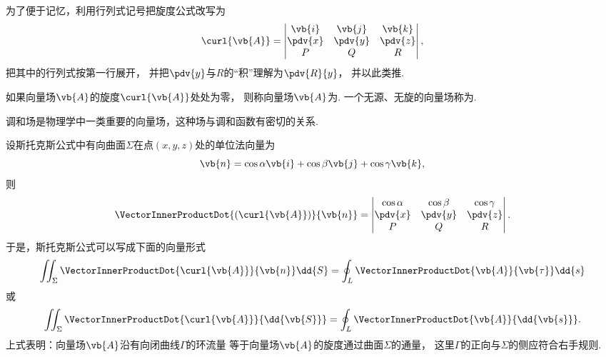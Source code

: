 为了便于记忆，利用行列式记号把旋度公式改写为\begin{equation*}
	\curl{\vb{A}}
	= \begin{vmatrix}
		\vb{i} & \vb{j} & \vb{k} \\
		\pdv{x} & \pdv{y} & \pdv{z} \\
		P & Q & R
	\end{vmatrix},
\end{equation*}
把其中的行列式按第一行展开，
并把\(\pdv{y}\)与\(R\)的“积”理解为\(\pdv{R}{y}\)，
并以此类推.

\begin{definition}
如果向量场\(\vb{A}\)的旋度\(\curl{\vb{A}}\)处处为零，
则称向量场\(\vb{A}\)为.
一个无源、无旋的向量场称为.
\end{definition}
调和场是物理学中一类重要的向量场，这种场与调和函数有密切的关系.

设斯托克斯公式中有向曲面\(\Sigma\)在点\((x,y,z)\)处的单位法向量为\begin{equation*}
	\vb{n} = \cos\alpha \vb{i} + \cos\beta \vb{j} + \cos\gamma \vb{k},
\end{equation*}
则\begin{equation*}
	\VectorInnerProductDot{(\curl{\vb{A}})}{\vb{n}}
	= \begin{vmatrix}
		\cos\alpha & \cos\beta & \cos\gamma \\
		\pdv{x} & \pdv{y} & \pdv{z} \\
		P & Q & R
	\end{vmatrix}.
\end{equation*}
于是，斯托克斯公式可以写成下面的向量形式\begin{equation*}
	\iint_\Sigma \VectorInnerProductDot{\curl{\vb{A}}}{\vb{n}} \dd{S}
	= \oint_L \VectorInnerProductDot{\vb{A}}{\vb{\tau}} \dd{s}
\end{equation*}或\begin{equation*}
	\iint_\Sigma \VectorInnerProductDot{\curl{\vb{A}}}{\dd{\vb{S}}}
	= \oint_L \VectorInnerProductDot{\vb{A}}{\dd{\vb{s}}}.
\end{equation*}
上式表明：向量场\(\vb{A}\)沿有向闭曲线\(\Gamma\)的环流量
等于向量场\(\vb{A}\)的旋度通过曲面\(\Sigma\)的通量，
这里\(\Gamma\)的正向与\(\Sigma\)的侧应符合右手规则.

